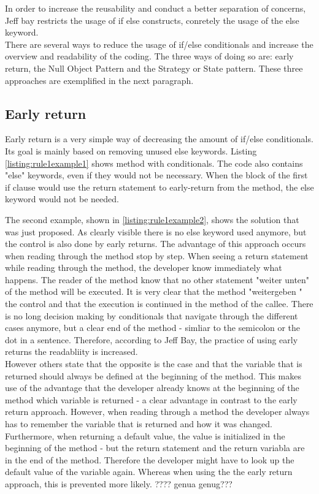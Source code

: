 In order to increase the reusability and conduct a better separation of concerns, Jeff bay restricts the usage of if else constructs, conretely the usage of the else keyword.
\\

There are several ways to reduce the usage of if/else conditionals and increase the overview and readability of the coding. The three ways of doing so are: early return, the Null Object Pattern and the Strategy or State pattern. These three approaches are exemplified in the next paragraph. 
\\

\subsection*{Early return}
Early return is a very simple way of decreasing the amount of if/else conditionals. Its goal is mainly based on removing unused else keywords. Listing \ref{listing:rule1example1} shows method with conditionals. The code also contains "else" keywords, even if they would not be necessary. When the block of the first if clause would use the return statement to early-return from the method, the else keyword would not be needed.

\label{listing:rule1example1}

\label{listing:rule1example2}
The second example, shown in \ref{listing:rule1example2}, shows the solution that was just proposed. As clearly visible there is no else keyword used anymore, but the control is also done by early returns. The advantage of this approach occurs when reading through the method stop by step. When seeing a return statement while reading through the method, the developer know immediately what happens. The reader of the method know that no other statement "weiter unten" of the method will be executed. It is very clear that the method "weitergeben " the control and that the execution is continued in the method of the callee. There is no long decision making by conditionals that navigate through the different cases anymore, but a clear end of the method - simliar to the semicolon or the dot in a sentence. Therefore, according to Jeff Bay, the practice of using early returns the readabliity is increased. \\

However others state that the opposite is the case and that the variable that is returned should always be defined at the beginning of the method. This makes use of the advantage that the developer already knows at the beginning of the method which variable is returned - a clear advantage in contrast to the early return approach. However, when reading through a method the developer always has to remember the variable that is returned and how it was changed. Furthermore, when returning a default value, the value is initialized in the beginning of the method - but the return statement and the return variabla are in the end of the method. Therefore the developer might have to look up the default value of the variable again. Whereas when using the the early return approach, this is prevented more likely. ???? genua genug???
\\

